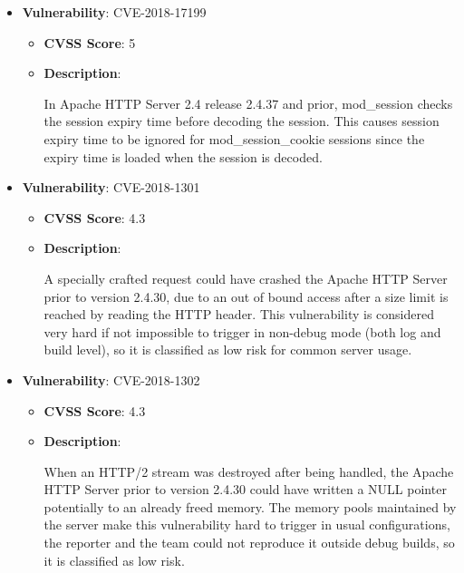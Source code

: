 \documentclass{article}
\begin{document}
\begin{itemize}
        \item \textbf{Vulnerability}: CVE-2018-17199
        \begin{itemize}
            \item \textbf{CVSS Score}:  5 
            \item \textbf{Description}:
            \parbox[t]{0.9\linewidth}{
                \ttfamily In Apache HTTP Server 2.4 release 2.4.37 and prior, mod\_session checks the session expiry time before decoding the session. This causes session expiry time to be ignored for mod\_session\_cookie sessions since the expiry time is loaded when the session is decoded.
            }
        \end{itemize}
    
        \item \textbf{Vulnerability}: CVE-2018-1301
        \begin{itemize}
            \item \textbf{CVSS Score}:  4.3 
            \item \textbf{Description}:
            \parbox[t]{0.9\linewidth}{
                \ttfamily A specially crafted request could have crashed the Apache HTTP Server prior to version 2.4.30, due to an out of bound access after a size limit is reached by reading the HTTP header. This vulnerability is considered very hard if not impossible to trigger in non-debug mode (both log and build level), so it is classified as low risk for common server usage.
            }
        \end{itemize}
    
        \item \textbf{Vulnerability}: CVE-2018-1302
        \begin{itemize}
            \item \textbf{CVSS Score}:  4.3 
            \item \textbf{Description}:
            \parbox[t]{0.9\linewidth}{
                \ttfamily When an HTTP/2 stream was destroyed after being handled, the Apache HTTP Server prior to version 2.4.30 could have written a NULL pointer potentially to an already freed memory. The memory pools maintained by the server make this vulnerability hard to trigger in usual configurations, the reporter and the team could not reproduce it outside debug builds, so it is classified as low risk.
            }
        \end{itemize}
    

\end{itemize}
\end{document}
